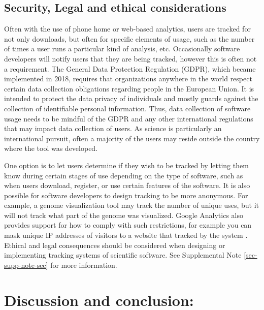 \documentclass{article}
\begin{document}
\subsection{Security, Legal and ethical considerations}\label{sec:legal_ethics}
Often with the use of phone home or web-based analytics, users are tracked for not only downloads, but often for specific elements of usage, such as the number of times a user runs a particular kind of analysis, etc. Occasionally software developers will notify users that they are being tracked, however this is often not a requirement. The General Data Protection Regulation (GDPR), which became implemented in 2018, requires that organizations anywhere in the world respect certain data collection obligations regarding people in the European Union. It is intended to protect the data privacy of individuals and mostly guards against the collection of identifiable personal information. Thus, data collection of software usage needs to be mindful of the GDPR and any other international regulations that may impact data collection of users.  As science is particularly an international pursuit, often a majority of the users may reside outside the country where the tool was developed.

One option is to let users determine if they wish to be tracked by letting them know during certain stages of use depending on the type of software, such as when users download, register, or use certain features of the software. It is also possible for software developers to design tracking to be more anonymous. For example, a genome visualization tool may track the number of unique uses, but it will not track what part of the genome was visualized. Google Analytics also provides support for how to comply with such restrictions, for example you can  mask unique IP addresses of visitors to a website that tracked by the system \cite{google_analytics_privacy}.  Ethical and legal consequences should be considered when designing or implementing tracking systems of scientific software. See Supplemental Note \ref{sec-supp-note-sec} for more information.



\section{Discussion and conclusion:}
\end{document}
